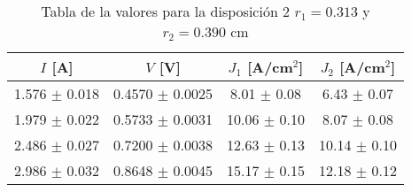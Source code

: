 \begin{table}[H]
    \centering
\begin{tabular}{cccc}
\toprule
$I$ [A] & $V$ [V] & $J_1$ [A/cm$^2$] & $J_2$ [A/cm$^2$] \\
\midrule
1.576 $\pm$ 0.018 & 0.4570 $\pm$ 0.0025 & 8.01 $\pm$ 0.08 & 6.43 $\pm$ 0.07 \\
1.979 $\pm$ 0.022 & 0.5733 $\pm$ 0.0031 & 10.06 $\pm$ 0.10 & 8.07 $\pm$ 0.08 \\
2.486 $\pm$ 0.027 & 0.7200 $\pm$ 0.0038 & 12.63 $\pm$ 0.13 & 10.14 $\pm$ 0.10 \\
2.986 $\pm$ 0.032 & 0.8648 $\pm$ 0.0045 & 15.17 $\pm$ 0.15 & 12.18 $\pm$ 0.12 \\
\bottomrule
\end{tabular}
    \caption{Tabla de la valores para la disposición 2 $r_1=0.313$ y $r_2= 0.390 $ cm }
    \label{Tab:VIJ_2}
\end{table}
